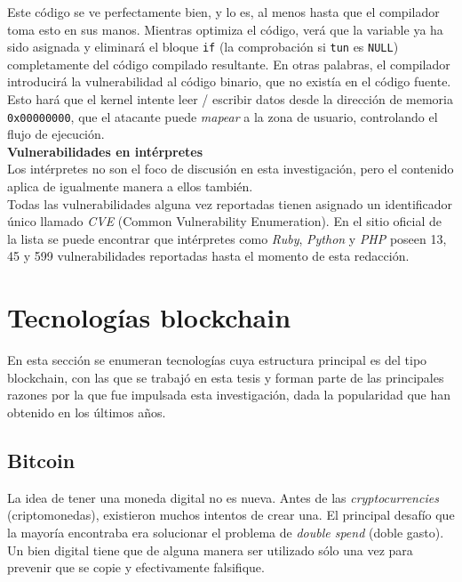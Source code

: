 Este código se ve perfectamente bien, y lo es, al menos hasta que el compilador toma esto en sus manos. Mientras optimiza el código, verá que la variable ya ha sido asignada y eliminará el bloque \texttt{if} (la comprobación si \texttt{tun} es \texttt{NULL}) completamente del código compilado resultante. En otras palabras, el compilador introducirá la vulnerabilidad al código binario, que no existía en el código fuente. Esto hará que el kernel intente leer / escribir datos desde la dirección de memoria \texttt{0x00000000}, que el atacante puede \textit{mapear} a la zona de usuario, controlando el flujo de ejecución. \\

\textbf{Vulnerabilidades en intérpretes}\\

Los intérpretes no son el foco de discusión en esta investigación, pero el contenido aplica de igualmente manera a ellos también.\\

Todas las vulnerabilidades alguna vez reportadas tienen asignado un identificador único llamado \textit{CVE} (Common Vulnerability Enumeration). En el sitio oficial de la lista se puede encontrar que intérpretes como \textit{Ruby}\cite{rubyvulns}, \textit{Python}\cite{pythonvulns} y \textit{PHP}\cite{phpvulns} poseen 13, 45 y 599 vulnerabilidades reportadas hasta el momento de esta redacción.


\section{Tecnologías blockchain}
\label{sect:marco:blockchain}
En esta sección se enumeran tecnologías cuya estructura principal es del tipo blockchain, con las que se trabajó en esta tesis y forman parte de las principales razones por la que fue impulsada esta investigación, dada la popularidad que han obtenido en los últimos años.


\subsection{Bitcoin}
La idea de tener una moneda digital no es nueva. Antes de las \textit{cryptocurrencies} (criptomonedas), existieron muchos intentos de crear una. El principal desafío que la mayoría encontraba era solucionar el problema de \textit{double spend} (doble gasto). Un bien digital tiene que de alguna manera ser utilizado sólo una vez para prevenir que se copie y efectivamente falsifique.\cite{briefhistorycryptoledger}\\

